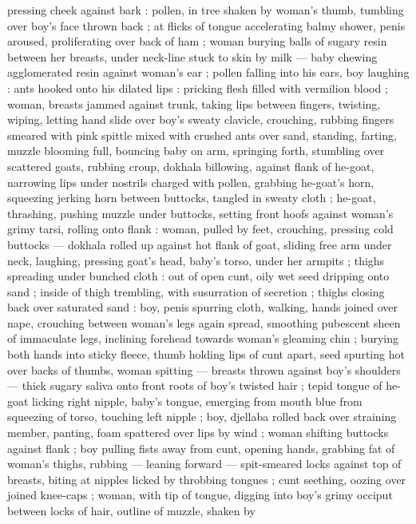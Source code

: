 {pressing cheek against bark : pollen, in tree shaken by woman's 
thumb, tumbling over boy's face thrown back ; at flicks of tongue 
accelerating balmy shower, penis aroused, proliferating over back of 
ham ; woman burying balls of sugary resin between her breasts, 
under neck-line stuck to skin by milk --- baby chewing agglomerated 
resin against woman's ear ; pollen falling into his ears, boy laughing 
: ants hooked onto his dilated lips : pricking flesh filled with vermilion 
blood ; woman, breasts jammed against trunk, taking lips between 
fingers, twisting, wiping, letting hand slide over boy's sweaty clavicle, 
crouching, rubbing fingers smeared with pink spittle mixed with 
crushed ants over sand, standing, farting, muzzle blooming full, 
bouncing baby on arm, springing forth, stumbling over scattered 
goats, rubbing croup, dokhala billowing, against flank of he-goat, 
narrowing lips under nostrils charged with pollen, grabbing he-goat's 
horn, squeezing jerking horn between buttocks, tangled in sweaty 
cloth ; he-goat, thrashing, pushing muzzle under buttocks, setting 
front hoofs against woman's grimy tarsi, rolling onto flank : woman, 
pulled by feet, crouching, pressing cold buttocks --- dokhala rolled 
up against hot flank of goat, sliding free arm under neck, laughing, 
pressing goat's head, baby's torso, under her armpits ; thighs 
spreading under bunched cloth : out of open cunt, oily wet seed 
dripping onto sand ; inside of thigh trembling, with susurration of 
secretion ; thighs closing back over saturated sand : boy, penis 
spurring cloth, walking, hands joined over nape, crouching between 
woman's legs again spread, smoothing pubescent sheen of 
immaculate legs, inclining forehead towards woman's gleaming chin 
; burying both hands into sticky fleece, thumb holding lips of cunt 
apart, seed spurting hot over backs of thumbs, woman spitting --- 
breasts thrown against boy's shoulders --- thick sugary saliva onto 
front roots of boy's twisted hair ; tepid tongue of he-goat licking 
right nipple, baby's tongue, emerging from mouth blue from 
squeezing of torso, touching left nipple ; boy, djellaba rolled back 
over straining member, panting, foam spattered over lips by wind ; 
woman shifting buttocks against flank ; boy pulling fists away from 
cunt, opening hands, grabbing fat of woman's thighs, rubbing --- 
leaning forward --- spit-smeared locks against top of breasts, biting 
at nipples licked by throbbing tongues ; cunt seething, oozing over 
joined knee-caps ; woman, with tip of tongue, digging into boy's 
grimy occiput between locks of hair, outline of muzzle, shaken by 
}
